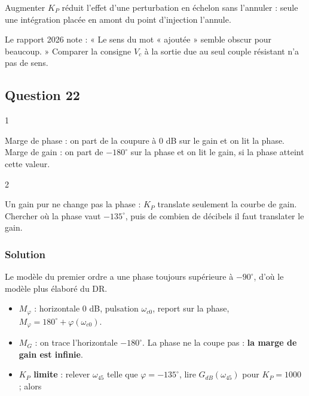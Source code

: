 \documentclass[11pt,a4paper]{article}
\providecommand{\tightlist}{\setlength{\itemsep}{0pt}\setlength{\parskip}{0pt}}
\begin{document}
\begin{methode}

Augmenter \(K_P\) réduit l'effet d'une perturbation en échelon sans l'annuler : seule une intégration placée en amont du point d'injection l'annule.

\end{methode}

\begin{piege}

Le rapport 2026 note : « Le sens du mot « ajoutée » semble obscur pour beaucoup. » Comparer la consigne \(V_c\) à la sortie due au seul couple résistant n'a pas de sens.

\end{piege}

\hypertarget{question-22}{%
\subsection{Question 22}\label{question-22}}

\begin{indication}{1}

Marge de phase : on part de la coupure à 0 dB sur le gain et on lit la phase. Marge de gain : on part de \(-180^\circ\) sur la phase et on lit le gain, si la phase atteint cette valeur.

\end{indication}

\begin{indication}{2}

Un gain pur ne change pas la phase : \(K_P\) translate seulement la courbe de gain. Chercher où la phase vaut \(-135^\circ\), puis de combien de décibels il faut translater le gain.

\end{indication}

\hypertarget{solution-21}{%
\subsubsection{Solution}\label{solution-21}}

Le modèle du premier ordre a une phase toujours supérieure à \(-90^\circ\), d'où le modèle plus élaboré du DR.

\begin{itemize}
\tightlist
\item
  \textbf{\(M_\varphi\)} : horizontale 0 dB, pulsation \(\omega_{c0}\), report sur la phase, \(M_\varphi=180^\circ+\varphi(\omega_{c0})\).
\item
  \textbf{\(M_G\)} : on trace l'horizontale \(-180^\circ\). La phase ne la coupe pas : \textbf{la marge de gain est infinie}.
\item
  \textbf{\(K_P\) limite} : relever \(\omega_{45}\) telle que \(\varphi=-135^\circ\), lire \(G_{dB}(\omega_{45})\) pour \(K_P=1000\) ; alors
\end{itemize}
\end{document}
